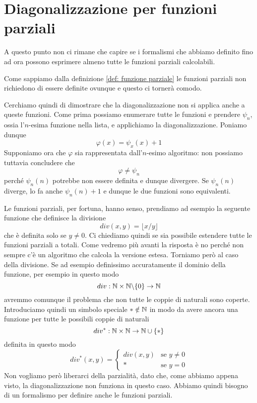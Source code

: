 \section{Diagonalizzazione per funzioni parziali}
A questo punto non ci rimane che capire se i formalismi che
abbiamo definito fino ad ora possono esprimere almeno tutte
le funzioni parziali calcolabili.

Come sappiamo dalla definizione \ref{def: funzione parziale}
le funzioni parziali non richiedono di essere definite ovunque
e questo ci tornerà comodo.

Cerchiamo quindi di dimostrare che la diagonalizzazione non si
applica anche a queste funzioni. Come prima possiamo enumerare
tutte le funzioni e prendere $\psi_n$, ossia l'$n$-esima
funzione nella lista, e applichiamo la diagonalizzazione.
Poniamo dunque
\[ \varphi (x) = \psi_x (x) + 1 \]
Supponiamo ora che $\varphi$ sia rappresentata dall'$n$-esimo
algoritmo: non possiamo tuttavia concludere che
\[ \varphi \neq \psi_n \]
perché $\psi_n(n)$ potrebbe non essere definita e dunque
divergere. Se $\psi_n(n)$ diverge, lo fa anche $\psi_n(n)+1$
e dunque le due funzioni sono equivalenti.

Le funzioni parziali, per fortuna, hanno senso, prendiamo ad
esempio la seguente funzione che definisce la divisione
\[ div (x,y) = \lfloor x / y \rfloor \]
che è definita solo se $y \neq 0$. Ci chiediamo quindi se sia
possibile estendere tutte le funzioni parziali a totali. Come
vedremo più avanti la risposta è no perché non sempre c'è un
algoritmo che calcola la versione estesa. Torniamo però al caso
della divisione. Se ad esempio definissimo accuratamente il
dominio della funzione, per esempio in questo modo
\[ div : \mathbb{N} \times \mathbb{N} \backslash \{ 0 \} \to \mathbb{N} \]
avremmo comunque il problema che non tutte le coppie di naturali
sono coperte. Introduciamo quindi un simbolo speciale
$* \notin \mathbb{N}$ in modo da avere ancora una funzione per tutte le
possibili coppie di naturali
\[ div^* : \mathbb{N} \times \mathbb{N} \to \mathbb{N} \cup \{ * \} \]
definita in questo modo
\[
	div^* (x, y) = \begin{cases}
		div(x, y) & \text{se } y \neq 0 \\
		*         & \text{se } y = 0
	\end{cases}
\]
Non vogliamo però liberarci della parzialità, dato che, come
abbiamo appena visto, la diagonalizzazione non funziona in
questo caso. Abbiamo quindi bisogno di un formalismo per
definire anche le funzioni parziali.
